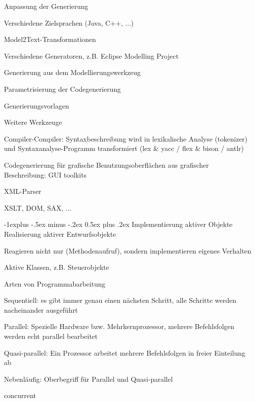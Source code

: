 \documentclass[a4paper]{article}
\makeatletter
\renewcommand{\subsection}{\@startsection{subsection}{2}{0mm}%
                                {-1explus -.5ex minus -.2ex}%
                                {0.5ex plus .2ex}%
                                {\normalfont\normalsize\bfseries}}
\makeatother
\begin{document}
\begin{multicols}{3}
  Anpassung der Generierung
  \begin{itemize*}
    \item Verschiedene Zielsprachen (Java, C++, ...)
    \item Model2Text-Transformationen
    \begin{itemize*}
      \item Verschiedene Generatoren, z.B. Eclipse Modelling Project
    \end{itemize*}
    \item Generierung aus dem Modellierungswerkzeug
    \begin{itemize*}
      \item Parametrisierung der Codegenerierung
      \item Generierungsvorlagen
    \end{itemize*}
  \end{itemize*}

  Weitere Werkzeuge
  \begin{itemize*}
    \item Compiler-Compiler: Syntaxbeschreibung wird in lexikalische Analyse (tokenizer) und Syntaxanalyse-Programm transformiert (lex \& yacc / flex \& bison / antlr)
    \item Codegenerierung für grafische Benutzungsoberflächen aus grafischer Beschreibung: GUI toolkits
    \item XML-Parser
    \begin{itemize*}
      \item XSLT, DOM, SAX, ...
    \end{itemize*}
  \end{itemize*}

  \subsection{Implementierung aktiver Objekte}
  Realisierung aktiver Entwurfsobjekte
  \begin{itemize*}
    \item Reagieren nicht nur (Methodenaufruf), sondern implementieren eigenes Verhalten
    \item Aktive Klassen, z.B. Steuerobjekte
  \end{itemize*}

  Arten von Programmabarbeitung
  \begin{itemize*}
    \item Sequentiell: es gibt immer genau einen nächsten Schritt, alle Schritte werden nacheinander ausgeführt
    \item Parallel: Spezielle Hardware bzw. Mehrkernprozessor, mehrere Befehlsfolgen werden echt parallel bearbeitet
    \item Quasi-parallel: Ein Prozessor arbeitet mehrere Befehlsfolgen in freier Einteilung ab
    \item Nebenläufig: Oberbegriff für Parallel und Quasi-parallel
    \begin{itemize*}
      \item concurrent
    \end{itemize*}
  \end{itemize*}


\end{multicols}
\end{document}
